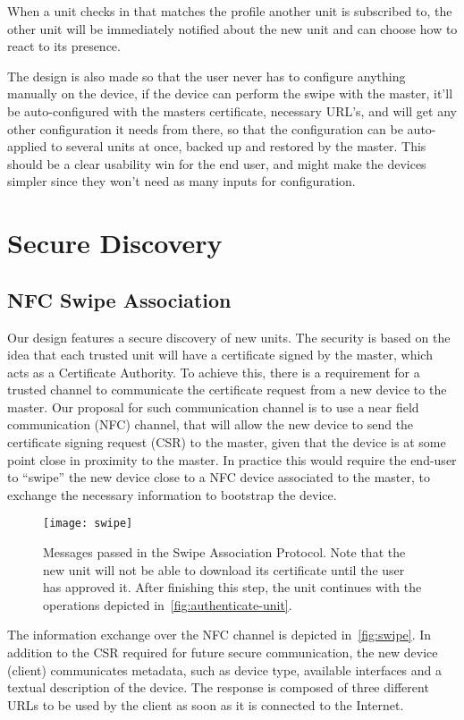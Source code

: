 When a unit checks in that matches the profile another unit is subscribed to, the other unit will be immediately notified about the new unit and can choose how to react to its presence.

The design is also made so that the user never has to configure anything manually on the device, if the device can perform the swipe with the master, it'll be auto-configured with the masters certificate, necessary URL’s, and will get any other configuration it needs from there, so that the configuration can be auto-applied to several units at once, backed up and restored by the master. This should be a clear usability win for the end user, and might make the devices simpler since they won't need as many inputs for configuration.

\section{Secure Discovery}
\subsection{NFC Swipe Association}
Our design features a secure discovery of new units. The security is based on the idea that each trusted unit will have a certificate signed by the master, which acts as a Certificate Authority. To achieve this, there is a requirement for a trusted channel to communicate the certificate request from a new device to the master. Our proposal for such communication channel is to use a near field communication (NFC) channel, that will allow the new device to send the certificate signing request (CSR) to the master, given that the device is at some point close in proximity to the master. In practice this would require the end-user to “swipe” the new device close to a NFC device associated to the master, to exchange the necessary information to bootstrap the device.

\begin{figure}[ht]
    \centering
    \texttt{[image: swipe]}\label{fig:swipe}
    \caption{Messages passed in the Swipe Association Protocol. Note that the new unit will not be able to download its certificate until the user has approved it. After finishing this step, the unit continues with the operations depicted in~\autoref{fig:authenticate-unit}.}
\end{figure}

The information exchange over the NFC channel is depicted in~\autoref{fig:swipe}. In addition to the CSR required for future secure communication, the new device (client) communicates metadata, such as device type, available interfaces and a textual description of the device. The response is composed of three different URLs to be used by the client as soon as it is connected to the Internet.

